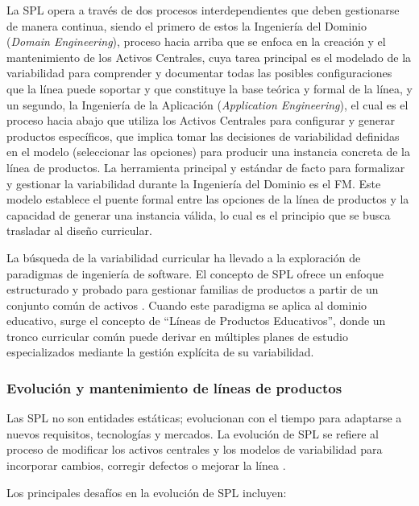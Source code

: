 La \ac{SPL} opera a través de dos procesos interdependientes que deben
gestionarse de manera continua, siendo el primero de estos la Ingeniería del
Dominio (\textit{Domain Engineering}), proceso hacia arriba que se enfoca en la
creación y el mantenimiento de los Activos Centrales, cuya tarea principal es el
modelado de la variabilidad para comprender y documentar todas las posibles
configuraciones que la línea puede soportar y que constituye la base teórica y
formal de la línea, y un segundo, la Ingeniería de la Aplicación (\textit{Application
Engineering}), el cual es el proceso hacia abajo que utiliza los Activos Centrales
para configurar y generar productos específicos, que implica tomar las
decisiones de variabilidad definidas en el modelo (seleccionar las opciones)
para producir una instancia concreta de la línea de productos. La herramienta
principal y estándar de facto para formalizar y gestionar la variabilidad durante
la Ingeniería del Dominio es el \ac{FM}.
Este modelo establece el puente formal entre las opciones de la línea de
productos y la capacidad de generar una instancia válida, lo cual es el principio
que se busca trasladar al diseño curricular.

La búsqueda de la variabilidad curricular ha llevado a la exploración 
de paradigmas de ingeniería de software. El concepto de \ac{SPL}
ofrece un enfoque estructurado y probado para gestionar familias de productos
a partir de un conjunto común de activos \citep{apel2013feature}. Cuando este
paradigma se aplica al dominio educativo, surge el concepto de ``Líneas de
Productos Educativos'', donde un tronco curricular común puede derivar en
múltiples planes de estudio especializados mediante la gestión explícita de su
variabilidad.

\subsubsection{Evolución y mantenimiento de líneas de productos}

Las \ac{SPL} no son entidades estáticas; evolucionan con el tiempo para adaptarse a 
nuevos requisitos, tecnologías y mercados. La evolución de \ac{SPL} se refiere al 
proceso de modificar los activos centrales y los modelos de variabilidad para incorporar 
cambios, corregir defectos o mejorar la línea \citep{apel2013feature}.

Los principales desafíos en la evolución de \ac{SPL} incluyen:

